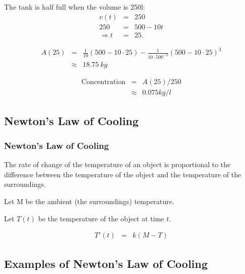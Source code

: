 \begin{frame}

  The tank is half full when the volume is 250l:
  \begin{eqnarray*}
    v(t) & = & 250 \\
    250 & = & 500-10t \\
    \Rightarrow t & = & 25.
  \end{eqnarray*}

  \begin{eqnarray*}
    A(25) & = & \frac{1}{10} (500-10\cdot 25) - \frac{1}{10\cdot500^{-2}} (500-10\cdot 25)^3 \\
    & \approx & 18.75 ~ kg
  \end{eqnarray*}

  \begin{eqnarray*}
    \mathrm{Concentration} & = & A(25)/250 \\
    & \approx & 0.075 kg/l
  \end{eqnarray*}

\end{frame}

\subsection{Newton's Law of Cooling}

\begin{frame}
  \frametitle{Newton's Law of Cooling}

  {\color{red}The rate of change of the temperature of an object is 
  proportional to the difference between the temperature of the 
  object and the temperature of the surroundings.}

  Let M be the ambient (the surroundings) temperature.  

  Let $T(t)$ be the temperature of the object at time $t$. 

  \begin{eqnarray*}
    T'(t) & = & k (M-T)
  \end{eqnarray*}


\end{frame}

\subsection{Examples of Newton's Law of Cooling}

